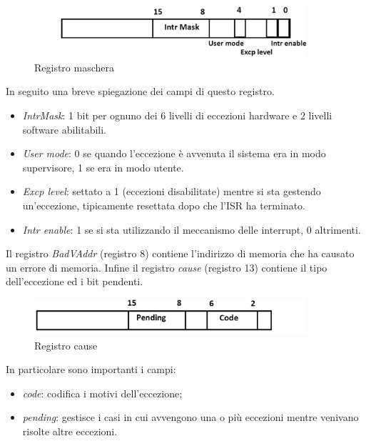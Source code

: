\documentclass[class=book, crop=false, oneside]{standalone}
\begin{document}
\begin{figure}[!h]
	\centering
	\includegraphics[width=0.9\textwidth,keepaspectratio]{registro-maschera}
	\caption{Registro maschera}
\end{figure}
In seguito una breve spiegazione dei campi di questo registro.
\begin{itemize}
	\item \emph{IntrMask}:  1 bit per ognuno dei 6 livelli di eccezioni hardware e 2 livelli software abilitabili.
	\item \emph{User mode}: 0 se quando l'eccezione è avvenuta il sistema era in modo supervisore, 1 se era in modo utente.
	\item \emph{Excp level}: settato a 1 (eccezioni disabilitate) mentre si sta gestendo un'eccezione, tipicamente resettata dopo che l'ISR ha terminato.
	\item \emph{Intr enable}: 1 se si sta utilizzando il meccanismo delle interrupt, 0 altrimenti.
\end{itemize}
Il registro \emph{BadVAddr} (registro 8) contiene l'indirizzo di memoria che ha causato un errore di memoria. Infine il registro \emph{cause} (registro 13) contiene il tipo dell'eccezione ed i bit pendenti.

\begin{figure}[!h]
	\centering
	\includegraphics[width=0.9\textwidth,keepaspectratio]{registro-cause}
	\caption{Registro cause}
\end{figure}
In particolare sono importanti i campi:
\begin{itemize}
	\item \emph{code}: codifica i motivi dell'eccezione;
	\item \emph{pending}: gestisce i casi in cui avvengono una o più eccezioni mentre venivano risolte altre eccezioni.
\end{itemize}
\end{document}

